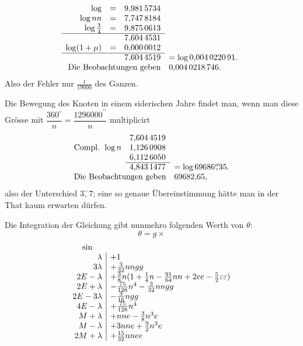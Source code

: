 \begingroup\small
\setlength{\arraycolsep}{2pt}
\renewcommand{\arraystretch}{1.15}
\[
\begin{array}{rcll}
\log&=&9{,}981\,5734&\\
\log nn&=&7{,}747\,8184&\\
\log\tfrac34&=&9{,}875\,0613&\\
\cline{1-3}
&&7{,}604\,4531&\\
\log(1+\mu)&=&0{,}000\,0012&\\
\cline{1-3}
&&7{,}604\,4519&=\log0{,}004\,0220\,91.\\
\multicolumn{3}{r}{\text{Die Beobachtungen geben}}&0{,}004\,0218\,746.
\end{array}
\]
\endgroup
\noindent Also der Fehler nur \(\tfrac1{19000}\) des Ganzen.
\par\noindent\hspace*{\parindent}Die Bewegung des Knoten in einem siderischen Jahre findet man, wenn
man diese Grösse mit \(\dfrac{360^\circ}{n}=\dfrac{1296000^{\prime\prime}}{n}\) multiplicirt
\begingroup\small
\setlength{\arraycolsep}{2pt}
\renewcommand{\arraystretch}{1.15}
\[
\begin{array}{rll}
&7{,}604\,4519&\\
\text{Compl. }\log n&1{,}126\,0908&\\
&6{,}112\,6050&\\
\cline{2-2}
&4{,}843\,1477&=\log69686\overset{\prime\prime}{,}35.\\
\multicolumn{2}{r}{\text{Die Beobachtungen geben}}&69682{,}65,
\end{array}
\]
\endgroup
\noindent also der Unterschied \(3\overset{\prime\prime}{,}7\); eine so genaue Übereinstimmung hätte man in der
That kaum erwarten dürfen.
\par\noindent\hspace*{\parindent}Die Integration der Gleichung gibt nunmehro folgenden Werth von \(\theta\):
\[
\theta=g\times
\]
\begingroup\small
\setlength{\arraycolsep}{4pt}
\renewcommand{\arraystretch}{1.3}
\[
\begin{array}{r|l}
\multicolumn{1}{c}{\sin}&\\
\lambda&+1\\
3\lambda&+\tfrac3{32}nngg\\
2E-\lambda&+\tfrac38n(1+\tfrac14n-\tfrac{91}{64}nn+2ee-\tfrac52\varepsilon\varepsilon)\\
2E+\lambda&-\tfrac{75}{128}n^4-\tfrac3{32}nngg\\
2E-3\lambda&-\tfrac3{16}ngg\\
4E-\lambda&+\tfrac{75}{128}n^4\\
M+\lambda&+nne-\tfrac38n^3e\\
M-\lambda&+3nne+\tfrac92n^3e\\
2M+\lambda&+\tfrac{15}{32}nnee
\end{array}
\]
